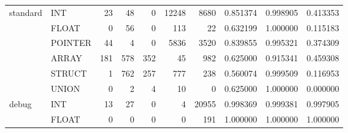 \begin{table}
\begin{tabular}{llrrrrrrrr}
\cline{1-10}
\multirow{6}{*}{standard} & INT &                                 23 &                                48 &                                0 &                             12248 &                            8680 &                        0.851374 &                               0.998905 &                             0.413353 \\
      & FLOAT &                                  0 &                                56 &                                0 &                               113 &                              22 &                        0.632199 &                               1.000000 &                             0.115183 \\
      & POINTER &                                 44 &                                 4 &                                0 &                              5836 &                            3520 &                        0.839855 &                               0.995321 &                             0.374309 \\
      & ARRAY &                                181 &                               578 &                              352 &                                45 &                             982 &                        0.625000 &                               0.915341 &                             0.459308 \\
      & STRUCT &                                  1 &                               762 &                              257 &                               777 &                             238 &                        0.560074 &                               0.999509 &                             0.116953 \\
      & UNION &                                  0 &                                 2 &                                4 &                                10 &                               0 &                        0.625000 &                               1.000000 &                             0.000000 \\
\cline{1-10}
\multirow{6}{*}{debug} & INT &                                 13 &                                27 &                                0 &                                 4 &                           20955 &                        0.998369 &                               0.999381 &                             0.997905 \\
      & FLOAT &                                  0 &                                 0 &                                0 &                                 0 &                             191 &                        1.000000 &                               1.000000 &                             1.000000 \\

\end{tabular}
\end{table}
